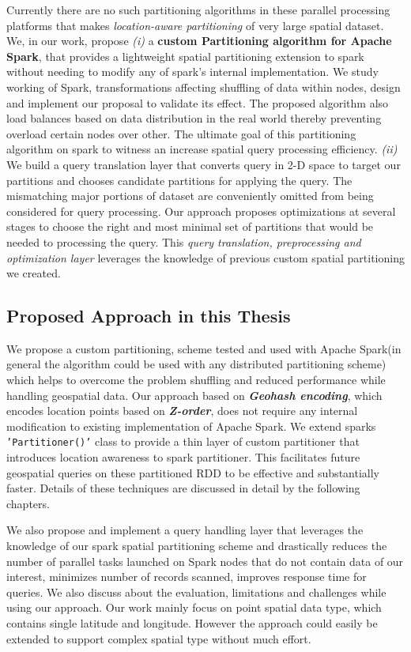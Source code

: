 \documentclass[article,type=msc,colorback,12pt,accentcolor=tud1d]{tudthesis}
\begin{document}
		Currently there are no such partitioning algorithms in these parallel processing platforms that makes \textit{location-aware partitioning} of very large spatial dataset. We, in our work,  propose \textit{(i)} a \textbf{custom Partitioning algorithm for Apache Spark}, that provides a lightweight spatial partitioning extension to spark without needing to modify any of spark's internal implementation. We study working of Spark, transformations affecting shuffling of data within nodes, design and implement our proposal to validate its effect. The proposed algorithm also load balances based on data distribution in the real world thereby preventing overload certain nodes over other. The ultimate goal of this partitioning algorithm on spark to witness an increase spatial query processing efficiency. \textit{(ii)} We build a query translation layer that converts query in 2-D space to target our partitions and chooses candidate partitions for applying the query. The mismatching major portions of dataset are conveniently omitted from being considered for query processing. Our approach proposes optimizations at several stages to choose the right and most minimal set of partitions that would be needed to processing the query. This \textit{query translation, preprocessing and optimization layer} leverages the knowledge of previous custom spatial partitioning we created.  
		
		\clearpage
		\subsection{Proposed Approach in this Thesis}
		\par We propose a custom partitioning, scheme tested and used with Apache Spark(in general the algorithm could be used with any distributed partitioning scheme) which helps to overcome the problem shuffling and reduced performance while handling geospatial data. Our approach based on \textbf{\textit{Geohash encoding}}, which encodes location points based on \textbf{\textit{Z-order}}, does not require any internal modification to existing implementation of Apache Spark. We extend sparks \texttt{'Partitioner()'} class to provide a thin layer of custom partitioner that introduces location awareness to spark partitioner. This facilitates future geospatial queries on these partitioned RDD to be effective and substantially faster. Details of these techniques are discussed in detail by the following chapters.
		
		We also propose and implement a query handling layer that leverages the knowledge of our spark spatial partitioning scheme and drastically reduces the number of parallel tasks launched on Spark nodes that do not contain data of our interest, minimizes number of records scanned, improves response time for queries. We also discuss about the evaluation, limitations and challenges while using our approach. Our work mainly focus on point spatial data type, which contains single latitude and longitude. However the approach could easily be extended to support complex spatial type without much effort.
		
\end{document}

